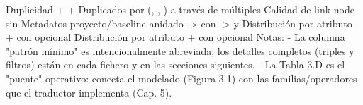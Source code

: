 \markdownRendererPipe{} Duplicidad \markdownRendererPipe{}  +  +  \markdownRendererPipe{} Duplicados por (, , ) a través de múltiples  \markdownRendererPipe{} \markdownRendererPipe{}  \markdownRendererPipe{} Calidad de link node \markdownRendererPipe{}  \markdownRendererPipe{}  sin  \markdownRendererPipe{} \markdownRendererPipe{}  \markdownRendererPipe{} Metadatos proyecto/baseline \markdownRendererPipe{}  anidado \markdownRendererPipe{} -> con -> y  \markdownRendererPipe{} \markdownRendererPipe{}  \markdownRendererPipe{} Distribución por atributo \markdownRendererPipe{}  +  \markdownRendererPipe{}  con  opcional \markdownRendererPipe{} \markdownRendererPipe{}  \markdownRendererPipe{} Distribución por atributo \markdownRendererPipe{}  +  \markdownRendererPipe{}  con  opcional \markdownRendererPipe{}\markdownRendererInterblockSeparator
{}Notas: - La columna "patrón mínimo" es intencionalmente abreviada; los detalles completos (triples y filtros) están en cada fichero  y en las secciones siguientes. - La Tabla 3.D es el "puente" operativo: conecta el modelado (Figura 3.1) con las familias/operadores que el traductor implementa (Cap. 5).\markdownRendererInterblockSeparator

